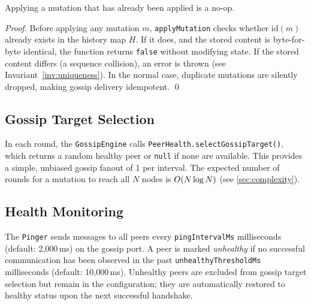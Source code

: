 \begin{theorem}[Idempotency]
\label{thm:idempotent}
Applying a mutation that has already been applied is a no-op.
\end{theorem}

\begin{proof}
Before applying any mutation $m$, \texttt{applyMutation} checks whether
$\mathrm{id}(m)$ already exists in the history map $H$. If it does, and the
stored content is byte-for-byte identical, the function returns \texttt{false}
without modifying state. If the stored content differs (a sequence collision),
an error is thrown (see Invariant~\ref{inv:uniqueness}). In the normal case,
duplicate mutations are silently dropped, making gossip delivery idempotent. \qed
\end{proof}

\subsection{Gossip Target Selection}

In each round, the \texttt{GossipEngine} calls
\texttt{PeerHealth.selectGossipTarget()}, which returns a random healthy peer
or \texttt{null} if none are available. This provides a simple, unbiased
gossip fanout of 1 per interval. The expected number of rounds for a mutation
to reach all $N$ nodes is $O\!\left(N \log N\right)$ (see \cref{sec:complexity}).

\subsection{Health Monitoring}

The \texttt{Pinger} sends  messages to all peers every
\texttt{pingIntervalMs} milliseconds (default: 2,000\,ms) on the gossip port.
A peer is marked \emph{unhealthy} if no successful communication has been
observed in the past \texttt{unhealthyThresholdMs} milliseconds (default:
10,000\,ms). Unhealthy peers are excluded from gossip target selection but
remain in the configuration; they are automatically restored to healthy status
upon the next successful handshake.
